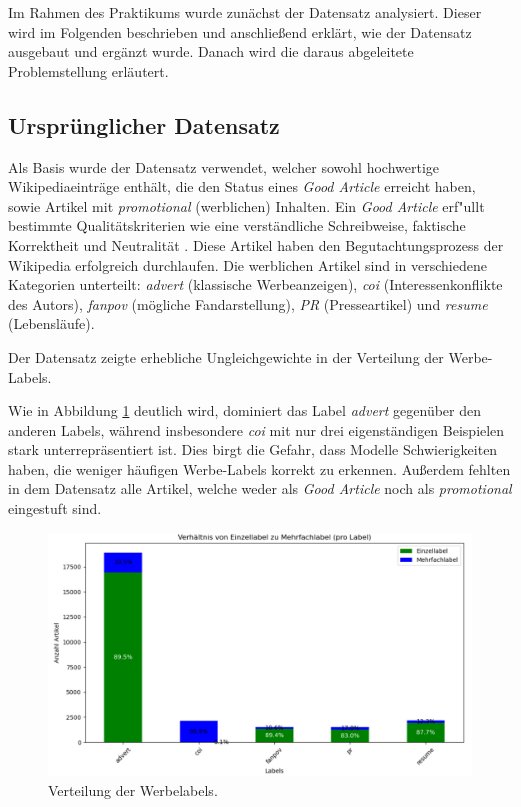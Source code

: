 Im Rahmen des Praktikums wurde zunächst der Datensatz analysiert. Dieser wird im Folgenden beschrieben und anschließend erklärt, wie der Datensatz ausgebaut und ergänzt wurde. Danach wird die daraus abgeleitete Problemstellung erläutert.

\subsection{Ursprünglicher Datensatz}
\label{UrsprunglicherDatensatz}
Als Basis wurde der Datensatz \cite{Urbanbricks2020} verwendet, welcher sowohl hochwertige Wikipediaeinträge enthält, die den Status eines \emph{Good Article} erreicht haben, sowie Artikel mit \textit{promotional} (werblichen) Inhalten. Ein \emph{Good Article} erf"ullt bestimmte Qualitätskriterien wie eine verständliche Schreibweise, faktische Korrektheit und Neutralität \cite{WikiGA}. Diese Artikel haben den Begutachtungsprozess der Wikipedia erfolgreich durchlaufen. Die werblichen Artikel sind in verschiedene Kategorien unterteilt: \emph{advert} (klassische Werbeanzeigen), \emph{coi} (Interessenkonflikte des Autors), \emph{fanpov} (mögliche Fandarstellung), \emph{PR} (Presseartikel) und \emph{resume} (Lebensläufe).

Der Datensatz zeigte erhebliche Ungleichgewichte in der Verteilung der Werbe-Labels.

Wie in Abbildung \ref{fig:labelverteilung} deutlich wird, dominiert das Label \emph{advert} gegenüber den anderen Labels, während insbesondere \emph{coi} mit nur drei eigenständigen Beispielen stark unterrepräsentiert ist. Dies birgt die Gefahr, dass Modelle Schwierigkeiten haben, die weniger häufigen Werbe-Labels korrekt zu erkennen. Außerdem fehlten in dem Datensatz alle Artikel, welche weder als \emph{Good Article} noch als \emph{promotional} eingestuft sind.

\begin{figure}[H]
    \centering
    \includegraphics[width=0.7\linewidth]{figures/labelverteilung.png}
    \caption{Verteilung der Werbelabels.}
    \label{fig:labelverteilung}
\end{figure}

